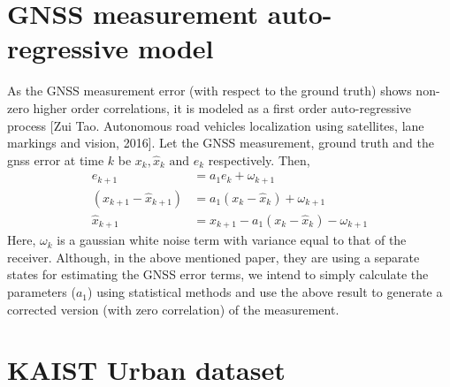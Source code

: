 \documentclass{article}
\begin{document}
\section{GNSS measurement auto-regressive model}
As the GNSS measurement error (with respect to the ground truth) shows non-zero higher order correlations, it is modeled as a first order auto-regressive process [Zui Tao. Autonomous road vehicles localization using satellites, lane markings and vision, 2016]. Let the GNSS measurement, ground truth and the gnss error at time $k$ be $x_k,\hat{x}_k \text{ and }e_k$ respectively. Then,
\begin{align}
    e_{k+1} &= a_1e_k + \omega_{k+1} \\
    (x_{k+1}-\hat{x}_{k+1}) &= a_1(x_k-\hat{x}_k) + \omega_{k+1} \\
    \hat{x}_{k+1} &= x_{k+1} - a_1(x_k-\hat{x}_k)-\omega_{k+1}
\end{align}
Here, $\omega_{k}$ is a gaussian white noise term with variance equal to that of the receiver. Although, in the above mentioned paper, they are using a separate states for estimating the GNSS error terms, we intend to simply calculate the parameters ($a_1$) using statistical methods and use the above result to generate a corrected version (with zero correlation) of the measurement. 




\section{KAIST Urban dataset}
\end{document}
